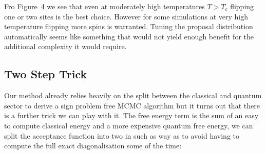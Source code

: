 Fro Figure~\protect\hyperlink{fig:comparison}{4} we see that even at moderately high temperatures \(T > T_c\) flipping one or two sites is the best choice. However for some simulations at very high temperature flipping more spins is warranted. Tuning the proposal distribution automatically seems like something that would not yield enough benefit for the additional complexity it would require.

\hypertarget{two-step-trick-2}{%
\subsection{Two Step Trick}\label{two-step-trick-2}}

Our method already relies heavily on the split between the classical and quantum sector to derive a sign problem free MCMC algorithm but it turns out that there is a further trick we can play with it. The free energy term is the sum of an easy to compute classical energy and a more expensive quantum free energy, we can split the acceptance function into two in such as way as to avoid having to compute the full exact diagonalisation some of the time:

\begin{Shaded}
\begin{Highlighting}[]
\OperatorTok{=}

 
\OperatorTok{=}

\OperatorTok{=}
    \OperatorTok{{-}}\OperatorTok{*}\OperatorTok{\textless{}}\NormalTok{,}\NormalTok{):}
\OperatorTok{=}
    
        \OperatorTok{{-}}\OperatorTok{*}\OperatorTok{\textless{}}\NormalTok{,}\NormalTok{):}
\OperatorTok{=}
    
\OperatorTok{=}
    
\end{Highlighting}
\end{Shaded}
